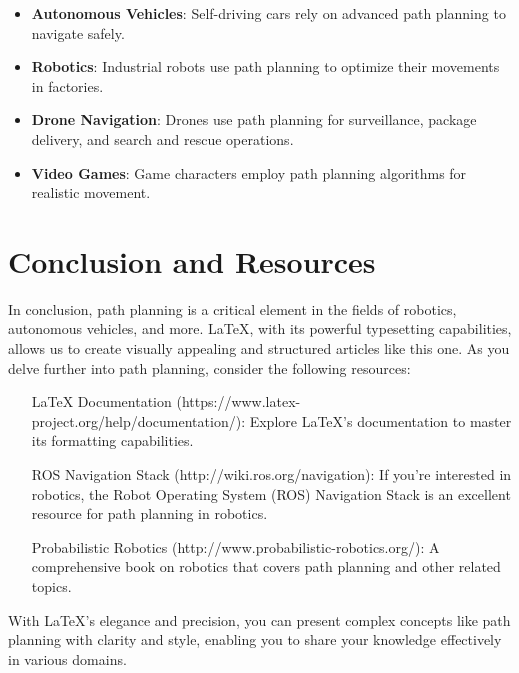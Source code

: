 \documentclass{article}
\begin{document}
\begin{itemize}
    \item \textbf{Autonomous Vehicles}: Self-driving cars rely on advanced path planning to navigate safely.
    \item \textbf{Robotics}: Industrial robots use path planning to optimize their movements in factories.
    \item \textbf{Drone Navigation}: Drones use path planning for surveillance, package delivery, and search and rescue operations.
    \item \textbf{Video Games}: Game characters employ path planning algorithms for realistic movement.
\end{itemize}

\section{Conclusion and Resources}
In conclusion, path planning is a critical element in the fields of robotics, autonomous vehicles, and more. LaTeX, with its powerful typesetting capabilities, allows us to create visually appealing and structured articles like this one. As you delve further into path planning, consider the following resources:

\begin{itemize}
    \item [LaTeX Documentation](https://www.latex-project.org/help/documentation/): Explore LaTeX's documentation to master its formatting capabilities.
    \item [ROS Navigation Stack](http://wiki.ros.org/navigation): If you're interested in robotics, the Robot Operating System (ROS) Navigation Stack is an excellent resource for path planning in robotics.
    \item [Probabilistic Robotics](http://www.probabilistic-robotics.org/): A comprehensive book on robotics that covers path planning and other related topics.
\end{itemize}

With LaTeX's elegance and precision, you can present complex concepts like path planning with clarity and style, enabling you to share your knowledge effectively in various domains.
\end{document}
